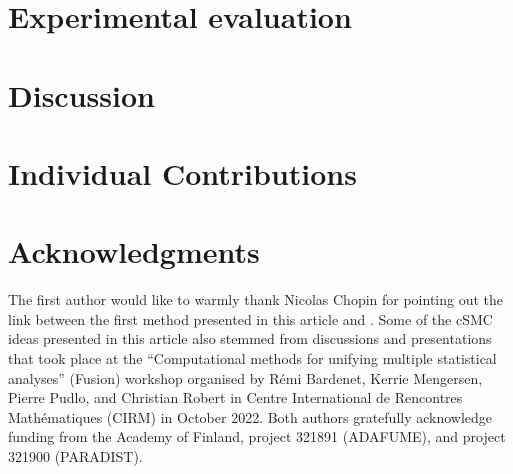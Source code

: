 \documentclass[a4paper,10pt]{article}
\begin{document}
    \section{Experimental evaluation}\label{sec:experiments}
    


    \section{Discussion}\label{sec:conclusion}
    

    \section*{Individual Contributions}\label{contribs}
    

    \section*{Acknowledgments}\label{ack}
    The first author would like to warmly thank Nicolas Chopin for pointing out the link between the first method presented in this article and \citet{titsias2018}. Some of the cSMC ideas presented in this article also stemmed from discussions and presentations that took place at the ``Computational methods for unifying multiple statistical analyses'' (Fusion) workshop organised by R\'emi Bardenet, Kerrie Mengersen, Pierre Pudlo, and Christian Robert in Centre International de Rencontres Mathématiques (CIRM) in October 2022. Both authors gratefully acknowledge funding from the Academy of Finland, project 321891 (ADAFUME), and project 321900 (PARADIST).

    
    
\end{document}
